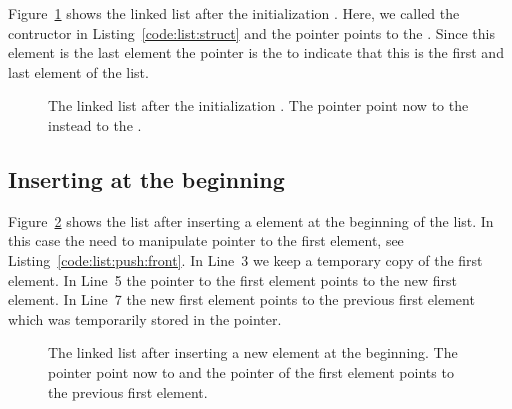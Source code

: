 Figure~\ref{fig:sketch:linked:list:init} shows the linked list after the initialization . Here, we called the contructor in Listing~\ref{code:list:struct} and the pointer  points to the . Since this element is the last element the pointer  is the  to indicate that this is the first and last element of the list.

\begin{figure}[h]
\centering
{}
\caption{The linked list after the initialization . The pointer  point now to the  instead to the .}
\label{fig:sketch:linked:list:init}
\end{figure}



\subsection*{Inserting at the beginning}

Figure~\ref{fig:sketch:linked:list:push_front} shows the list after inserting a element at the beginning of the list. In this case the need to manipulate pointer  to the first element, see Listing~\ref{code:list:push:front}. In Line~3 we keep a temporary copy  of the first element. In Line~5 the pointer to the first element points to the new first element. In Line~7 the new first element points to the previous first element which was temporarily stored in the  pointer.


\begin{figure}[h]
\centering
{}
\caption{The linked list after inserting a new element at the beginning. The pointer  point now to  and the pointer  of the first element points to the previous first element.}
\label{fig:sketch:linked:list:push_front}
\end{figure}

